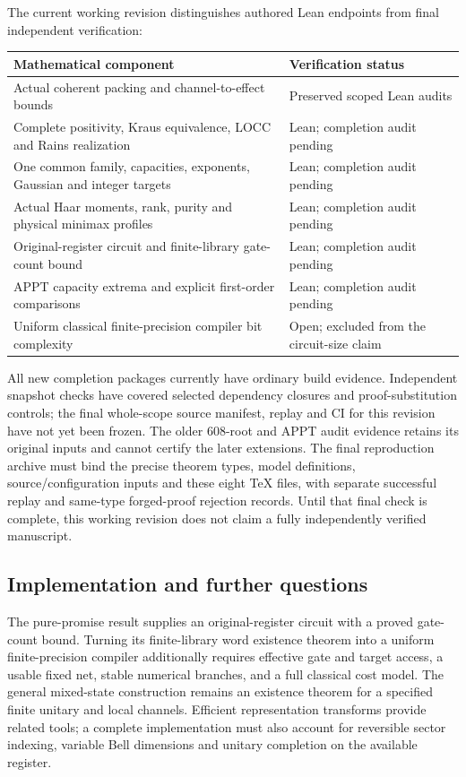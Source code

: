 The current working revision distinguishes authored Lean endpoints from final independent verification:
\begin{center}
\begin{tabular}{>{\raggedright\arraybackslash}p{}>{\raggedright\arraybackslash}p{}}
\toprule
Mathematical component & Verification status\\
\midrule
Actual coherent packing and channel-to-effect bounds & Preserved scoped Lean audits\\
Complete positivity, Kraus equivalence, LOCC and Rains realization & Lean; completion audit pending\\
One common family, capacities, exponents, Gaussian and integer targets & Lean; completion audit pending\\
Actual Haar moments, rank, purity and physical minimax profiles & Lean; completion audit pending\\
Original-register circuit and finite-library gate-count bound & Lean; completion audit pending\\
APPT capacity extrema and explicit first-order comparisons & Lean; completion audit pending\\
Uniform classical finite-precision compiler bit complexity & Open; excluded from the circuit-size claim\\
\bottomrule
\end{tabular}
\end{center}
All new completion packages currently have ordinary build evidence. Independent snapshot checks have covered selected dependency closures and proof-substitution controls; the final whole-scope source manifest, replay and CI for this revision have not yet been frozen. The older 608-root and APPT audit evidence retains its original inputs and cannot certify the later extensions. The final reproduction archive must bind the precise theorem types, model definitions, source/configuration inputs and these eight TeX files, with separate successful replay and same-type forged-proof rejection records. Until that final check is complete, this working revision does not claim a fully independently verified manuscript.

\subsection{Implementation and further questions}
The pure-promise result supplies an original-register circuit with a proved gate-count bound. Turning its finite-library word existence theorem into a uniform finite-precision compiler additionally requires effective gate and target access, a usable fixed net, stable numerical branches, and a full classical cost model. The general mixed-state construction remains an existence theorem for a specified finite unitary and local channels. Efficient representation transforms \cite{bch,kirby,krovi} provide related tools; a complete implementation must also account for reversible sector indexing, variable Bell dimensions and unitary completion on the available register.

